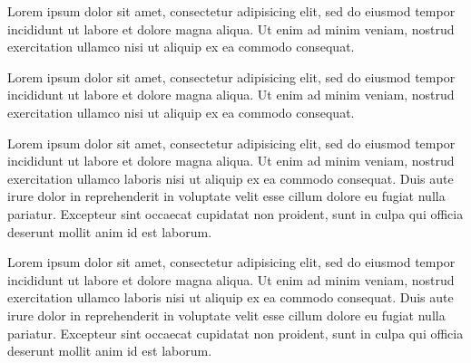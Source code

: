 \documentclass{book}
\begin{document}
\begin{pages}
\begin{Leftside}
\beginnumbering
\pstart
\begin{ledgroup}

Lorem ipsum dolor sit amet, consectetur adipisicing elit, sed do eiusmod tempor incididunt ut labore et dolore magna aliqua. Ut enim ad minim veniam, nostrud exercitation ullamco  nisi ut aliquip ex ea commodo consequat. 
\end{ledgroup}
\pend

\pstart
\begin{ledgroup}

Lorem ipsum dolor sit amet, consectetur adipisicing elit, sed do eiusmod tempor incididunt ut labore et dolore magna aliqua. Ut enim ad minim veniam, nostrud exercitation ullamco  nisi ut aliquip ex ea commodo consequat. 
\end{ledgroup}
\pend

\endnumbering
\end{Leftside}

\begin{Rightside}
\beginnumbering

\pstart
\begin{ledgroup}

Lorem ipsum dolor sit amet, consectetur adipisicing elit, sed do eiusmod tempor incididunt ut labore et dolore magna aliqua. Ut enim ad minim veniam, nostrud exercitation ullamco laboris nisi ut aliquip ex ea commodo consequat. Duis aute irure dolor in reprehenderit in voluptate velit esse cillum dolore eu fugiat nulla pariatur. Excepteur sint occaecat cupidatat non proident, sunt in culpa qui officia deserunt mollit anim id est laborum.
\end{ledgroup}
\pend

\pstart
\begin{ledgroup}

Lorem ipsum dolor sit amet, consectetur adipisicing elit, sed do eiusmod tempor incididunt ut labore et dolore magna aliqua. Ut enim ad minim veniam, nostrud exercitation ullamco laboris nisi ut aliquip ex ea commodo consequat. Duis aute irure dolor in reprehenderit in voluptate velit esse cillum dolore eu fugiat nulla pariatur. Excepteur sint occaecat cupidatat non proident, sunt in culpa qui officia deserunt mollit anim id est laborum.
\end{ledgroup}
\pend

\endnumbering
\end{Rightside}
\Pages
\end{pages}
\end{document}
